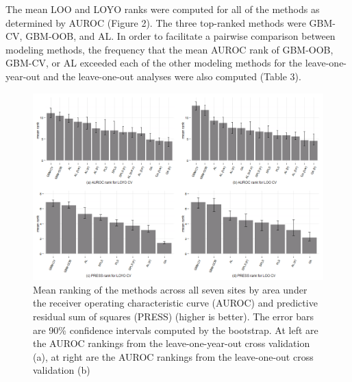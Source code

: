 \documentclass[authoryear,review, 12pt]{elsarticle}
\begin{document}
The mean LOO and LOYO ranks were computed for all of the methods as
determined by AUROC (Figure 2). The three top-ranked methods were
GBM-CV, GBM-OOB, and AL. In order to facilitate a pairwise comparison
between modeling methods, the frequency that the mean AUROC rank of
GBM-OOB, GBM-CV, or AL exceeded each of the other modeling methods for
the leave-one-year-out and the leave-one-out analyses were also computed
(Table 3).

\begin{figure}[htbp]
\centering
\includegraphics{figure/auroc-barchart.png}
\caption{Mean ranking of the methods across all seven sites by area
under the receiver operating characteristic curve (AUROC) and predictive
residual sum of squares (PRESS) (higher is better). The error bars are
90\% confidence intervals computed by the bootstrap. At left are the
AUROC rankings from the leave-one-year-out cross validation (a), at
right are the AUROC rankings from the leave-one-out cross validation
(b)}
\end{figure}
\end{document}
